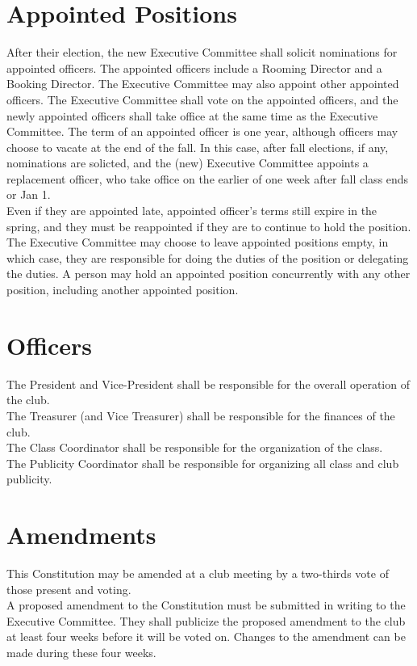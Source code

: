 \documentclass{article}
\begin{document}
\section{Appointed Positions}
After their election, the new Executive Committee shall solicit nominations for appointed officers. The appointed officers include a Rooming Director and a Booking Director. The Executive Committee may also appoint other appointed officers. The Executive Committee shall vote on the appointed officers, and the newly appointed officers shall take office at the same time as the Executive Committee. 
The term of an appointed officer is one year, although officers may choose to vacate at the end of the fall. In this case, after fall elections, if any, nominations are solicted, and the (new) Executive Committee appoints a replacement officer, who take office on the earlier of one week after fall class ends or Jan 1. \\ Even if they are appointed late, appointed officer's terms still expire in the spring, and they must be reappointed if they are to continue to hold the position. 
The Executive Committee may choose to leave appointed positions empty, in which case, they are responsible for doing the duties of the position or delegating the duties.
 A person may hold an appointed position concurrently with any other position,
including another appointed position.\\
\section {Officers}
The President and Vice-President shall be responsible for the overall operation of the club.\\
The Treasurer (and Vice Treasurer) shall be responsible for the finances of the club.\\
The Class Coordinator shall be responsible for the organization of the class.\\
The Publicity Coordinator shall be responsible for organizing all class and club publicity. \\
\section {Amendments}
This Constitution may be amended at a club meeting by a two-thirds vote of
those present and voting.\\
A proposed amendment to the Constitution must be submitted in writing to the Executive Committee. They shall publicize the proposed amendment to the club at least four weeks before it will be voted on. Changes to the amendment can be made during these four weeks. 
\end{document}
